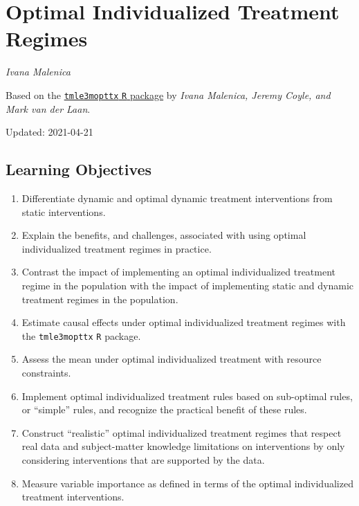 \documentclass[12pt, krantz2,]{krantz}
\providecommand{\tightlist}{%
  \setlength{\itemsep}{0pt}\setlength{\parskip}{0pt}}
\theoremstyle{definition}
\theoremstyle{definition}
\theoremstyle{definition}
\newcommand{\1}{\mathbbm{1}}
\begin{document}
\hypertarget{optimal-individualized-treatment-regimes}{%
\section{Optimal Individualized Treatment Regimes}\label{optimal-individualized-treatment-regimes}}

\emph{Ivana Malenica}

Based on the \href{https://github.com/tlverse/tmle3mopttx}{\texttt{tmle3mopttx} \texttt{R} package}
by \emph{Ivana Malenica, Jeremy Coyle, and Mark van der Laan}.

Updated: 2021-04-21

\hypertarget{learning-objectives-4}{%
\subsection{Learning Objectives}\label{learning-objectives-4}}

\begin{enumerate}
\def\labelenumi{\arabic{enumi}.}
\tightlist
\item
  Differentiate dynamic and optimal dynamic treatment interventions from static
  interventions.
\item
  Explain the benefits, and challenges, associated with using optimal
  individualized treatment regimes in practice.
\item
  Contrast the impact of implementing an optimal individualized treatment
  regime in the population with the impact of implementing static and dynamic
  treatment regimes in the population.
\item
  Estimate causal effects under optimal individualized treatment regimes with
  the \texttt{tmle3mopttx} \texttt{R} package.
\item
  Assess the mean under optimal individualized treatment with resource
  constraints.
\item
  Implement optimal individualized treatment rules based on sub-optimal
  rules, or ``simple'' rules, and recognize the practical benefit of these rules.
\item
  Construct ``realistic'' optimal individualized treatment regimes that respect
  real data and subject-matter knowledge limitations on interventions by
  only considering interventions that are supported by the data.
\item
  Measure variable importance as defined in terms of the optimal individualized
  treatment interventions.
\end{enumerate}
\end{document}
